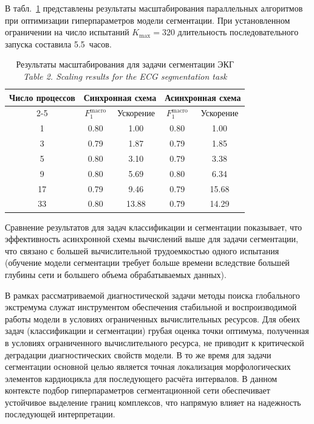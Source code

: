 \documentclass[10pt,a4paper]{book}
\begin{document}
В табл.~\ref{tab_segmentation_scalability} представлены результаты масштабирования параллельных алгоритмов при оптимизации гиперпараметров модели сегментации. При установленном ограничении на число испытаний $K_{\max} = 320$ длительность последовательного запуска составила 5.5~часов.

\begin{table}[ht]
\caption{Результаты масштабирования для задачи сегментации ЭКГ \\ \textit{Table 2. Scaling results for the ECG segmentation task}}
\label{tab_segmentation_scalability}
\centering
\begin{tabular}{|c|c|c|c|c|}
\hline
Число процессов & \multicolumn{2}{c|}{Синхронная схема} & \multicolumn{2}{c|}{Асинхронная схема} \\
\cline{2-5}
& $F_1^{\mathrm{macro}}$ & Ускорение & $F_1^{\mathrm{macro}}$ & Ускорение \\
\hline
1  & 0.80  & 1.00   & 0.80  & 1.00  \\
3  & 0.79   & 1.87    & 0.79  & 1.85  \\
5  & 0.80   & 3.10    & 0.79  & 3.38  \\
9  & 0.80  & 5.69   & 0.80  & 6.34  \\
17 & 0.79  & 9.46   & 0.79  & 15.68 \\
33 & 0.80  & 13.88  & 0.79  & 14.29 \\
\hline
\end{tabular}
\end{table}

Сравнение результатов для задач классификации и сегментации показывает, что эффективность асинхронной схемы вычислений выше для задачи сегментации, что связано с большей вычислительной трудоемкостью одного испытания (обучение модели сегментации требует больше времени вследствие большей глубины сети и большего объема обрабатываемых данных).

В рамках рассматриваемой диагностической задачи методы поиска глобального экстремума служат инструментом обеспечения стабильной и воспроизводимой работы модели в условиях ограниченных вычислительных ресурсов. Для обеих задач (классификации и сегментации) грубая оценка точки оптимума, полученная в условиях ограниченного вычислительного ресурса, не приводит к критической деградации диагностических свойств модели. В то же время для задачи сегментации основной целью является точная локализация морфологических элементов кардиоцикла для последующего расчёта интервалов. В данном контексте подбор гиперпараметров сегментационной сети обеспечивает устойчивое выделение границ комплексов, что напрямую влияет на надежность последующей интерпретации.
\end{document}
